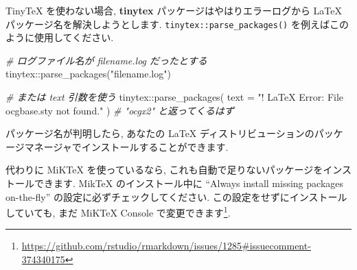 \documentclass[
  11pt,
  lualatex,
  ja=standard]{bxjsreport}
\newenvironment{Shaded}{\begin{snugshade}}{\end{snugshade}}
\newcommand{\AttributeTok}[1]{\textcolor[rgb]{0.77,0.63,0.00}{#1}}
\newcommand{\CommentTok}[1]{\textcolor[rgb]{0.56,0.35,0.01}{\textit{#1}}}
\newcommand{\FunctionTok}[1]{\textcolor[rgb]{0.00,0.00,0.00}{#1}}
\newcommand{\NormalTok}[1]{#1}
\newcommand{\SpecialCharTok}[1]{\textcolor[rgb]{0.00,0.00,0.00}{#1}}
\newcommand{\StringTok}[1]{\textcolor[rgb]{0.31,0.60,0.02}{#1}}
\renewcommand{\href}[2]{#2\footnote{\url{#1}}}
\begin{document}
TinyTeX を使わない場合, \textbf{tinytex} パッケージはやはりエラーログから LaTeX パッケージ名を解決しようとします. \texttt{tinytex::parse\_packages()} を例えばこのように使用してください.

\begin{Shaded}
\begin{Highlighting}[numbers=left,,]
\CommentTok{\# ログファイル名が filename.log だったとする}
\NormalTok{tinytex}\SpecialCharTok{::}\FunctionTok{parse\_packages}\NormalTok{(}\StringTok{"filename.log"}\NormalTok{)}

\CommentTok{\# または \textasciigrave{}text\textasciigrave{} 引数を使う}
\NormalTok{tinytex}\SpecialCharTok{::}\FunctionTok{parse\_packages}\NormalTok{(}
  \AttributeTok{text =} \StringTok{"! LaTeX Error: File \textasciigrave{}ocgbase.sty\textquotesingle{} not found."}
\NormalTok{)}
\CommentTok{\# "ocgx2" と返ってくるはず}
\end{Highlighting}
\end{Shaded}

パッケージ名が判明したら, あなたの LaTeX ディストリビューションのパッケージマネージャでインストールすることができます.

代わりに MiKTeX を使っているなら, これも自動で足りないパッケージをインストールできます. MikTeX のインストール中に ``Always install missing packages on-the-fly'' の設定に必ずチェックしてください. この設定をせずにインストールしていても, \href{https://github.com/rstudio/rmarkdown/issues/1285\#issuecomment-374340175}{まだ MiKTeX Console で変更できます}.
\end{document}
